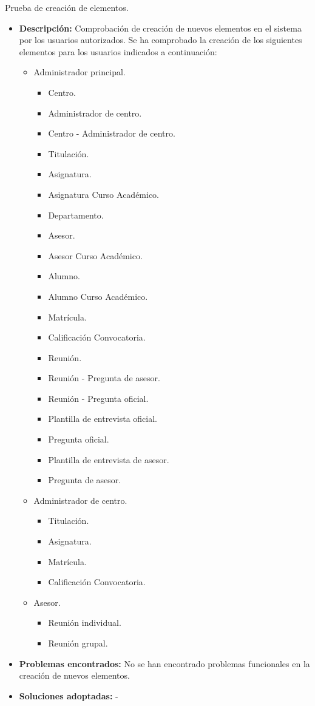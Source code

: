 \item Prueba de creación de elementos.
  \begin{itemize}
    \item \textbf{Descripción:} Comprobación de creación de nuevos elementos
    en el sistema por los usuarios autorizados. Se ha comprobado la creación de
    los siguientes elementos para los usuarios indicados a continuación:

    \begin{itemize}
      \item Administrador principal.
      \begin{itemize}
        \item Centro.
        \item Administrador de centro.
        \item Centro - Administrador de centro.
        \item Titulación.
        \item Asignatura.
        \item Asignatura Curso Académico.
        \item Departamento.
        \item Asesor.
        \item Asesor Curso Académico.
        \item Alumno.
        \item Alumno Curso Académico.
        \item Matrícula.
        \item Calificación Convocatoria.
        \item Reunión.
        \item Reunión - Pregunta de asesor.
        \item Reunión - Pregunta oficial.
        \item Plantilla de entrevista oficial.
        \item Pregunta oficial.
        \item Plantilla de entrevista de asesor.
        \item Pregunta de asesor.
      \end{itemize}
      \item Administrador de centro.
      \begin{itemize}
        \item Titulación.
        \item Asignatura.
        \item Matrícula.
        \item Calificación Convocatoria.
      \end{itemize}
      \item Asesor.
      \begin{itemize}
        \item Reunión individual.
        \item Reunión grupal.
      \end{itemize}
    \end{itemize}

    \item \textbf{Problemas encontrados:} No se han encontrado problemas
    funcionales en la creación de nuevos elementos.
    \item \textbf{Soluciones adoptadas:} -
  \end{itemize}


